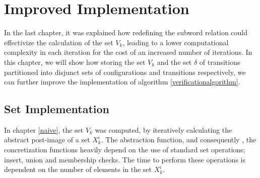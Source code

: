 \section{Improved Implementation}
In the last chapter, it was explained how redefining the subword relation could effectivize the calculation of the set $V_k$, leading to a lower computational complexity in each iteration for the cost of an increased number of iterations. In this chapter, we will show how storing the set $V_k$ and the set $\delta$ of transitions partitioned into disjunct sets of configurations and transitions respectively, we can further improve the implementation of algorithm \ref{verificationalgorithm}.



\subsection{Set Implementation}
In chapter \ref{naive}, the set $V_k$ was computed, by iteratively calculating the abstract post-image of a set $X_k^i$. The abstraction function, and consequently , the concretization functions heavily depend on the use of standard set operations; insert, union and membership checks. The time to perform these operations is dependent on the number of elements in the set $X_k^i$.


